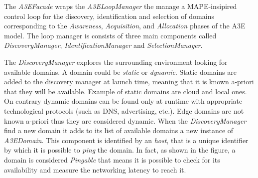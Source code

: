 The \textit{A3EFacade} wraps the \textit{A3ELoopManager} the manage a MAPE-insipired control loop for the discovery, identification and selection of domains corresponding to the \textit{Awareness}, \textit{Acquisition}, and \textit{Allocation} phases of the A3E model. The loop manager is consists of three main components called \textit{DiscoveryManager}, \textit{IdentificationManager} and \textit{SelectionManager}.

The \textit{DiscoveryManager} explores the surrounding environment looking for available domains. A domain could be \textit{static} or \textit{dynamic}. Static domains are added to the discovery manager at launch time, meaning that it is known a-priori that they will be available. Example of static domains are cloud and local ones. On contrary dynamic domains can be found only at runtime with appropriate technological protocols (such as DNS, advertising, etc.). Edge domains are not known a-priori thus they are considered dynamic. When the \textit{DiscoveryManager} find a new domain it adds to its list of available domains a new instance of  \textit{A3EDomain}. This component is identified by an \textit{host}, that is a unique identifier by which it is possible to \textit{ping} the domain. In fact, as shown in the figure, a domain is considered \textit{Pingable} that means it is possible to check for its availability and measure the networking latency to reach it.






